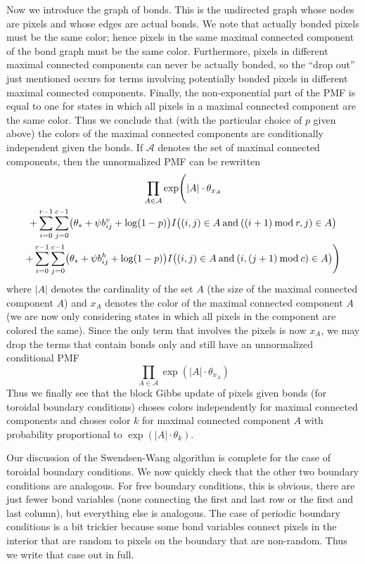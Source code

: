 \documentclass[11pt]{article}
\renewcommand{\mod}{\mathbin{\rm mod}}
\newcommand{\opand}{\mathbin{\rm and}}
\newcommand{\abs}[1]{\lvert #1 \rvert}
\begin{document}
Now we introduce the graph of bonds.  This is the undirected graph whose
nodes are pixels and whose edges are actual bonds.  We note that actually
bonded pixels must
be the same color; hence pixels in the same maximal connected component of
the bond graph must be the same color.  Furthermore, pixels in different
maximal connected components can never be actually bonded,
so the ``drop out'' just mentioned occurs for terms involving potentially
bonded pixels in different maximal connected components.  Finally, the
non-exponential part of the PMF is equal to one for
states in which all pixels in a maximal connected component are the same
color.  Thus we conclude that (with the particular choice of $p$ given above)
the colors of the maximal connected components are conditionally independent
given the bonds.  If $\mathcal{A}$ denotes the set of maximal connected
components, then the unnormalized PMF can be rewritten
\begin{multline*}
   \prod_{A \in \mathcal{A}}
   \exp\Biggl(
   \abs{A} \cdot \theta_{x_A}
   \\
   +
   \sum_{i = 0}^{r - 1}
   \sum_{j = 0}^{c - 1}
   \bigl( \theta_* + \psi b^v_{i j} + \log(1 - p) \bigr)
   I\bigl((i, j) \in A \opand ((i + 1) \mod r, j) \in A\bigr)
   \\
   +
   \sum_{i = 0}^{r - 1}
   \sum_{j = 0}^{c - 1}
   \bigl( \theta_* + \psi b^h_{i j} + \log(1 - p) \bigr)
   I\bigl((i, j) \in A \opand (i, (j + 1) \mod c) \in A \bigr)
   \Biggr)
\end{multline*}
where $\abs{A}$ denotes the cardinality of the set $A$ (the size of the
maximal connected component $A$) and $x_A$ denotes the color of the maximal
connected component $A$ (we are now only considering states in which all
pixels in the component are colored the same).  Since the only term that
involves the pixels is now $x_A$, we may drop the terms that contain bonds
only and still have an unnormalized conditional PMF
$$
   \prod_{A \in \mathcal{A}} \exp( \abs{A} \cdot \theta_{x_A} )
$$
Thus we finally see that the block Gibbs update of pixels given bonds
(for toroidal boundary conditions) choses colors independently for maximal
connected components and choses color $k$ for maximal connected component $A$
with probability proportional to $\exp( \abs{A} \cdot \theta_k )$.

Our discussion of the Swendsen-Wang algorithm is complete for the case of
toroidal boundary conditions.  We now quickly check that the other two boundary
conditions are analogous.  For free boundary conditions, this is obvious,
there are just fewer bond variables (none connecting the first and last row
or the first and last column), but everything else is analogous.
The case of periodic boundary conditions is a bit trickier because some
bond variables connect pixels in the interior that are random to pixels
on the boundary that are non-random.  Thus we write that case out in full.
\end{document}
